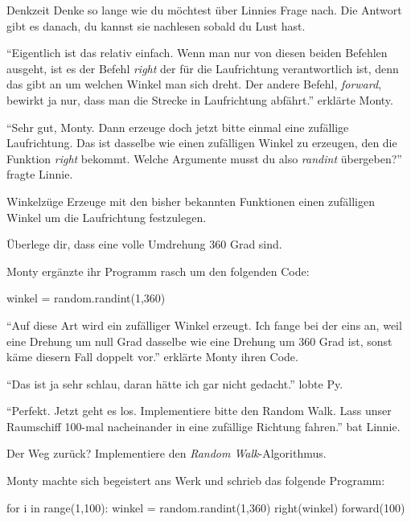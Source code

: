 \documentclass[a5paper,12pt,twoside,openright]{scrbook}
\begin{document}
\begin{aufgabe}{Denkzeit}
 Denke so lange wie du möchtest über Linnies Frage nach. 
 Die Antwort gibt es danach, du kannst sie nachlesen sobald du Lust hast.
\end{aufgabe}

"`Eigentlich ist das relativ einfach. Wenn man nur von diesen beiden Befehlen ausgeht, ist es der Befehl \emph{right} 
der für die Laufrichtung verantwortlich ist, denn das gibt an um welchen Winkel man sich dreht.
Der andere Befehl, \emph{forward}, bewirkt ja nur, dass man die Strecke in Laufrichtung abfährt."' erklärte Monty.

"`Sehr gut, Monty. Dann erzeuge doch jetzt bitte einmal eine zufällige Laufrichtung.
Das ist dasselbe wie einen zufälligen Winkel zu erzeugen, den die Funktion \emph{right} bekommt.
Welche Argumente musst du also \emph{randint} übergeben?"' fragte Linnie.

\begin{aufgabe}{Winkelzüge}
 Erzeuge mit den bisher bekannten Funktionen einen zufälligen Winkel um die Laufrichtung festzulegen.
\end{aufgabe}

\begin{lip}
Überlege dir, dass eine volle Umdrehung 360 Grad sind. 
\end{lip}

Monty ergänzte ihr Programm rasch um den folgenden Code:
\begin{pythoncode}
winkel = random.randint(1,360) 
\end{pythoncode}

"`Auf diese Art wird ein zufälliger Winkel erzeugt. Ich fange bei der eins an, weil eine Drehung um null Grad 
dasselbe wie eine Drehung um 360 Grad ist, sonst käme diesern Fall doppelt vor."' erklärte Monty ihren Code.

"`Das ist ja sehr schlau, daran hätte ich gar nicht gedacht."' lobte Py.

"`Perfekt. Jetzt geht es los. Implementiere bitte den Random Walk. 
Lass unser Raumschiff 100-mal nacheinander in eine zufällige Richtung fahren."' bat Linnie. 

\begin{aufgabe}{Der Weg zurück?}
 Implementiere den \emph{Random Walk}-Algorithmus.
\end{aufgabe}

Monty machte sich begeistert ans Werk und schrieb das folgende Programm:
\begin{pythoncode}
for i in range(1,100):
    winkel = random.randint(1,360) 
    right(winkel)
    forward(100)
\end{pythoncode}
\end{document}
